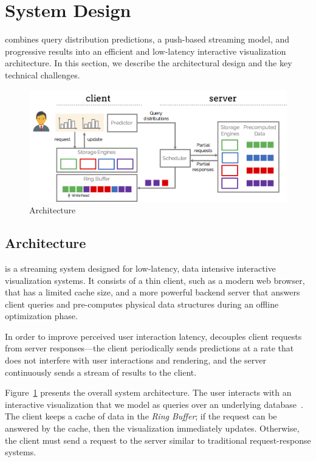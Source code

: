 \section{System Design}\label{s:arch}
\sys combines query distribution predictions, a push-based streaming model, and progressive results into an efficient and low-latency interactive visualization architecture.  In this section, we describe the architectural design and the key technical challenges.

\begin{figure}[tb]
	\centering
	\includegraphics[width=\columnwidth]{figures/arch}
 	\caption{\sys Architecture}
  \label{fig:arch}
\end{figure}

\subsection{Architecture}

\sys is a streaming system designed for low-latency, data intensive interactive visualization systems.  It  consists of a thin client, such as a modern web browser, that has a limited cache size, and a more powerful backend server that answers client queries and pre-computes physical data structures during an offline optimization phase.  

In order to improve perceived user interaction latency, \sys decouples client requests from server responses---the client periodically sends predictions at a rate that does not interfere with user interactions and rendering, and the server continuously sends a stream of results to the client. 

Figure~\ref{fig:arch} presents the overall system architecture.
The user interacts with an interactive visualization that we model as queries over an underlying database~\cite{wucombining,EugeneWuVision2014}.  The client keeps a cache of data in the {\it Ring Buffer}; if the request can be answered by the cache, then the visualization immediately updates.  Otherwise, the client must send a request to the server similar to traditional request-response systems.

